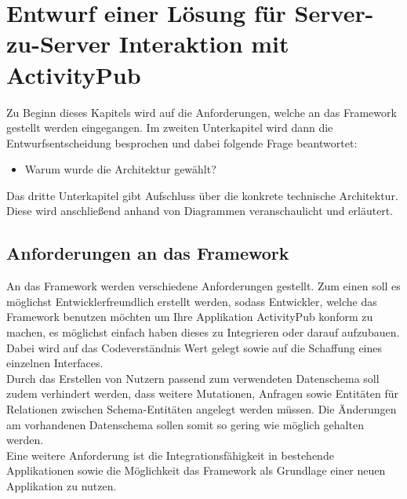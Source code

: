 \chapter{Entwurf einer Lösung für Server-zu-Server Interaktion mit ActivityPub}
	Zu Beginn dieses Kapitels wird auf die Anforderungen, welche an das Framework gestellt werden eingegangen. Im zweiten Unterkapitel wird dann die Entwurfsentscheidung besprochen und dabei folgende Frage beantwortet:
	\begin{itemize}
		\item Warum wurde die Architektur gewählt?
	\end{itemize}
	Das dritte Unterkapitel gibt Aufschluss über die konkrete technische Architektur. Diese wird anschließend anhand von Diagrammen veranschaulicht und erläutert.
\section{Anforderungen an das Framework}
	An das Framework werden verschiedene Anforderungen gestellt. Zum einen soll es möglichst Entwicklerfreundlich erstellt werden, sodass Entwickler, welche das Framework benutzen möchten um Ihre Applikation ActivityPub konform zu machen, es möglichst einfach haben dieses zu Integrieren oder darauf aufzubauen. Dabei wird auf das Codeverständnis Wert gelegt sowie auf die Schaffung eines einzelnen Interfaces.\\
	
	Durch das Erstellen von Nutzern passend zum verwendeten Datenschema soll zudem verhindert werden, dass weitere Mutationen, Anfragen sowie Entitäten für Relationen zwischen Schema-Entitäten angelegt werden müssen. Die Änderungen am vorhandenen Datenschema sollen somit so gering wie möglich gehalten werden.\\
	
	Eine weitere Anforderung ist die Integrationsfähigkeit in bestehende Applikationen sowie die Möglichkeit das Framework als Grundlage einer neuen Applikation zu nutzen.\\
	
